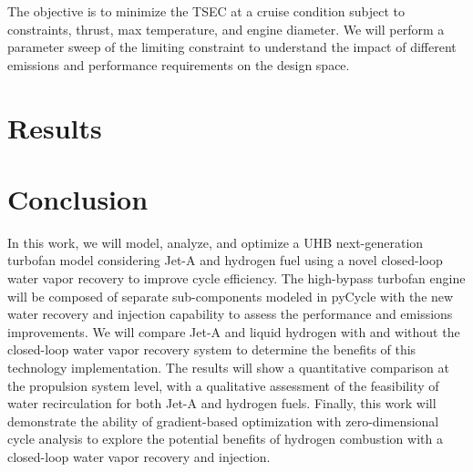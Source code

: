 \documentclass[conf]{new-aiaa}
\begin{document}
The objective is to minimize the TSEC at a cruise condition subject to constraints, thrust, max temperature, and engine diameter.
We will perform a parameter sweep of the limiting constraint to understand the impact of different emissions and performance requirements on the design space.

\section{Results}
\label{sec:results}


\section{Conclusion}
\label{sec:conc}
In this work, we will model, analyze, and optimize a UHB next-generation turbofan model considering Jet-A and hydrogen fuel using a novel closed-loop water vapor recovery to improve cycle efficiency.
The high-bypass turbofan engine will be composed of separate sub-components modeled in pyCycle with the new water recovery and injection capability to assess the performance and emissions improvements.
We will compare Jet-A and liquid hydrogen with and without the closed-loop water vapor recovery system to determine the benefits of this technology implementation.
The results will show a quantitative comparison at the propulsion system level, with a qualitative assessment of the feasibility of water recirculation for both Jet-A and hydrogen fuels.
Finally, this work will demonstrate the ability of gradient-based optimization with zero-dimensional cycle analysis to explore the potential benefits of hydrogen combustion with a closed-loop water vapor recovery and injection.


\end{document}
